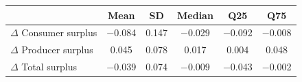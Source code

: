 \begin{tabular}{lccccc}
\toprule
 & Mean & SD & Median & Q25 & Q75 \\
\midrule
$\Delta$ Consumer surplus & $-$0.084 & 0.147 & $-$0.029 & $-$0.092 & $-$0.008 \\
$\Delta$ Producer surplus & 0.045 & 0.078 & 0.017 & 0.004 & 0.048 \\
$\Delta$ Total surplus & $-$0.039 & 0.074 & $-$0.009 & $-$0.043 & $-$0.002 \\
\bottomrule
\end{tabular}
